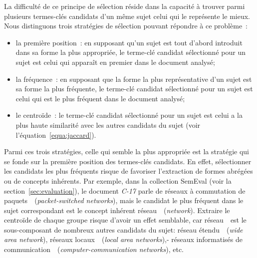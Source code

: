     La difficulté de ce principe de sélection réside dans la capacité à trouver
    parmi plusieurs termes-clés candidats d'un même sujet celui qui le
    représente le mieux. Nous distinguons trois stratégies de sélection pouvant
    répondre à ce problème~:
    \begin{itemize}
      \item{la première position~: en supposant qu'un sujet est tout d'abord
            introduit dans sa forme la plus appropriée, le terme-clé candidat
            sélectionné pour un sujet est celui qui apparaît en premier dans le
            document analysé;}
      \item{la fréquence~: en supposant que la forme la plus représentative d'un
            sujet est sa forme la plus fréquente, le terme-clé candidat
            sélectionné pour un sujet est celui qui est le plus fréquent dans le
            document analysé;}
      \item{le centroïde~: le terme-clé candidat sélectionné pour un sujet est
            celui a la plus haute similarité avec les autres candidats du sujet
            (voir l'équation~\ref{equa:jaccard}).}
    \end{itemize}
    Parmi ces trois stratégies, celle qui semble la plus appropriée est la
    stratégie qui se fonde sur la première position des termes-clés candidats.
    En effet, sélectionner les candidats les plus fréquents risque de favoriser
    l'extraction de formes abrégées ou de concepts inhérents. Par exemple, dans
    la collection SemEval (voir la section~\ref{sec:evaluation}), le document
    \textit{C-17} parle de \og réseaux à commutation de
    paquets~\fg\ (\textit{packet-switched networks}), mais le candidat le plus
    fréquent dans le sujet correspondant est le concept inhérent
    \og réseau~\fg\ (\textit{network}). Extraire le centroïde de chaque groupe
    risque d'avoir un effet semblable, car \og réseau~\fg\ est le sous-composant
    de nombreux autres candidats du sujet:
    \og réseau étendu~\fg\ (\textit{wide area network}),
    \og réseaux locaux~\fg\ (\textit{local area networks}),-
    \og réseaux informatisés de communication~\fg\ (\textit{computer-communication networks}),
    etc.

